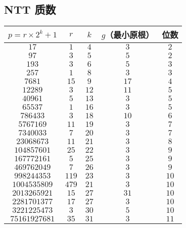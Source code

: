 \documentclass[12pt]{ctexart}
\begin{document}
\subsection{NTT 质数}
\begin{table}[H]
	\centering
	\begin{tabular}{|c|c|c|c|c|}

		\toprule
		$p=r\times 2^k+1$     & $r$   & $k$  & $g$（最小原根） & 位数   \\
		\midrule
		$17$                  & $1$   & $4$  & $3$       & $2$  \\
		$97$                  & $3$   & $5$  & $5$       & $2$  \\
		$193$                 & $3$   & $6$  & $5$       & $3$  \\
		$257$                 & $1$   & $8$  & $3$       & $3$  \\
		$7681$                & $15$  & $9$  & $17$      & $4$  \\
		$12289$               & $3$   & $12$ & $11$      & $5$  \\
		$40961$               & $5$   & $13$ & $3$       & $5$  \\
		$65537$               & $1$   & $16$ & $3$       & $5$  \\
		$786433$              & $3$   & $18$ & $10$      & $6$  \\
		$5767169$             & $11$  & $19$ & $3$       & $7$  \\
		$7340033$             & $7$   & $20$ & $3$       & $7$  \\
		$23068673$            & $11$  & $21$ & $3$       & $8$  \\
		$104857601$           & $25$  & $22$ & $3$       & $9$  \\
		$167772161$           & $5$   & $25$ & $3$       & $9$  \\
		$469762049$           & $7$   & $26$ & $3$       & $9$  \\
		$998244353$           & $119$ & $23$ & $3$       & $10$ \\
		$1004535809$          & $479$ & $21$ & $3$       & $10$ \\
		$2013265921$          & $15$  & $27$ & $31$      & $10$ \\
		$2281701377$          & $17$  & $27$ & $3$       & $10$ \\
		$3221225473$          & $3$   & $30$ & $5$       & $10$ \\
		$75161927681$         & $35$  & $31$ & $3$       & $11$ \\

\end{tabular}
\end{table}
\end{document}
